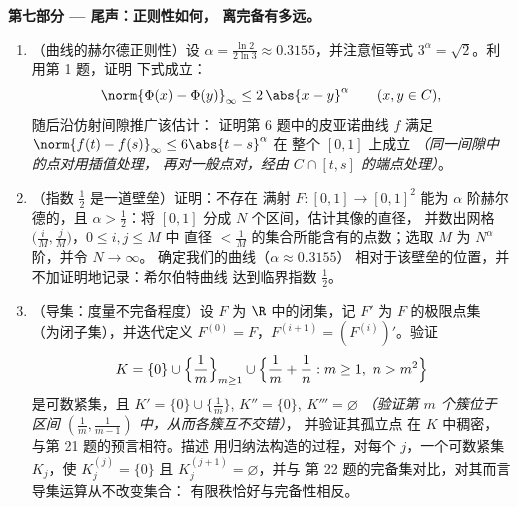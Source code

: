 \begin{problem}
\medskip
\noindent\textbf{第七部分 --- 尾声：正则性如何，
离完备有多远。}
\begin{enumerate}[resume]
  \item （曲线的赫尔德正则性）设 $\alpha =
        \frac{\ln 2}{2\ln 3} \approx 0.3155$，并注意恒等式
        $3^\alpha = \sqrt2$。利用第 1 题，证明
        下式成立：
        \[
        \norm{\Phi(x) - \Phi(y)}_\infty \leq 2\,\abs{x -
        y}^\alpha \qquad (x, y \in C),
        \]
        随后沿仿射间隙推广该估计：
        证明第 6 题中的皮亚诺曲线 $f$ 满足
        $\norm{f(t) - f(s)}_\infty \leq 6\abs{t - s}^\alpha$ 在
        整个 $[0,1]$ 上成立 \emph{（同一间隙中的点对用插值处理，
        再对一般点对，经由
        $C \cap [t, s]$ 的端点处理）}。
  \item （指数 $\frac12$ 是一道壁垒）证明：不存在
        满射 $F \colon [0,1] \to [0,1]^2$ 能为
        $\alpha$ 阶赫尔德的，且 $\alpha > \frac12$：将 $[0,1]$
        分成 $N$ 个区间，估计其像的直径，
        并数出网格
        $\bigl(\frac iM, \frac jM\bigr)$，$0 \leq i, j \leq M$ 中
        直径 $< \frac1M$ 的集合所能含有的点数；选取
        $M$ 为 $N^\alpha$ 阶，并令 $N \to \infty$。
        确定我们的曲线（$\alpha \approx 0.3155$）
        相对于该壁垒的位置，并不加证明地记录：希尔伯特曲线
        达到临界指数 $\frac12$。
  \item （导集：度量不完备程度）设 $F$
        为 $\R$ 中的闭集，记 $F'$ 为 $F$ 的极限点集
        （为闭子集），并迭代定义 $F^{(0)} = F$，$F^{(i+1)}
        = (F^{(i)})'$。验证
        \[
        K = \{0\} \cup \Bigl\{\frac1m\Bigr\}_{m \geq 1} \cup
        \Bigl\{\frac1m + \frac1n : m \geq 1,\ n > m^2\Bigr\}
        \]
        是可数紧集，且 $K' = \{0\} \cup
        \{\frac1m\}$, $K'' = \{0\}$, $K''' = \varnothing$
        \emph{（验证第 $m$ 个簇位于
        区间 $(\frac1m, \frac1{m-1})$ 中，从而各簇互不交错）}，
        并验证其孤立点
        在 $K$ 中稠密，与第 21 题的预言相符。描述
        用归纳法构造的过程，对每个 $j$，一个可数紧集
        $K_j$，使 $K_j^{(j)} = \{0\}$ 且 $K_j^{(j+1)} =
        \varnothing$，并与
        第 22 题的完备集对比，对其而言导集运算从不改变集合：
        有限秩恰好与完备性相反。
\end{enumerate}
\end{problem}
